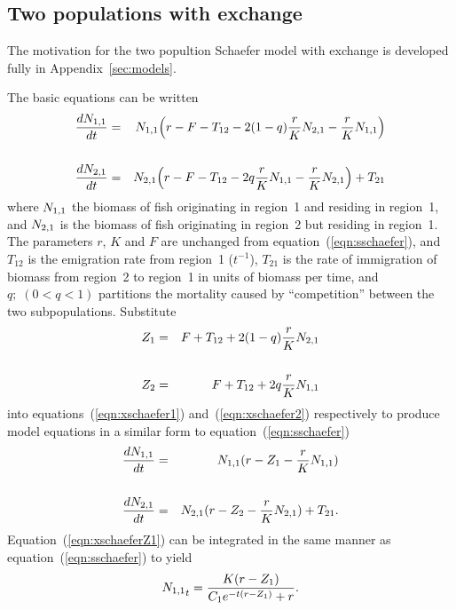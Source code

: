 \subsection{Two populations with exchange}
The motivation for the two popultion Schaefer model with exchange is
developed fully in Appendix~\ref{sec:models}.

The basic equations can be written
\begin{eqnarray}
\label{eqn:xschaefer1}
\frac{d{N_{1,1}}}{dt}&=&{N_{1,1}}\Big(r-F-T_{12}-2(1-q)\frac{r}{K}{N_{2,1}}-\frac{r}{K}{N_{1,1}}\Big)\\
\nonumber\\
\label{eqn:xschaefer2}
\frac{d{N_{2,1}}}{dt}&=&{N_{2,1}}\Big(r-F-T_{12}-2q\frac{r}{K}{N_{1,1}}-\frac{r}{K}{N_{2,1}}\Big)+T_{21}
\end{eqnarray}
where ${N_{1,1}}$ the biomass of fish originating in region~1
and residing in region~1,
and ${N_{2,1}}$ is the biomass of fish originating in region~2
but residing in region~1.
The parameters $r$, $K$ and $F$ are unchanged from
equation~(\ref{eqn:sschaefer}), and
$T_{12}$ is the emigration rate from region~1 ($t^{-1}$), 
$T_{21}$ is the rate of immigration of biomass from region~2 to
region~1 in units of biomass per time,
and $q;\; (0 < q < 1)$ partitions the mortality caused by ``competition''
between the two subpopulations.
Substitute
\begin{eqnarray}
\label{eqn:Zdef}
Z_1&=&F+T_{12}+2(1-q)\frac{r}{K}{N_{2,1}}\\
\nonumber\\
Z_2&=&F+T_{12}+2q\frac{r}{K}{N_{1,1}}
\end{eqnarray}
into equations~(\ref{eqn:xschaefer1}) and~(\ref{eqn:xschaefer2})
respectively to produce model equations in a similar form to
equation~(\ref{eqn:sschaefer})
\begin{eqnarray}
\label{eqn:xschaeferZ1}
\frac{d{N_{1,1}}}{dt}&=&{N_{1,1}}(r-Z_1-\frac{r}{K}{N_{1,1}})\\
\nonumber\\
\label{eqn:xschaeferZ2}
\frac{d{N_{2,1}}}{dt}&=&{N_{2,1}}(r-Z_2-\frac{r}{K}{N_{2,1}})+T_{21}.
\end{eqnarray}
Equation~(\ref{eqn:xschaeferZ1}) can be integrated in the same manner as
equation~(\ref{eqn:sschaefer}) to yield
\begin{equation}
\label{eqn:N1tC}
{N_{1,1}}_t=\frac{K(r-Z_1)}{C_1e^{-t(r-Z_1)}+r}.
\end{equation}


